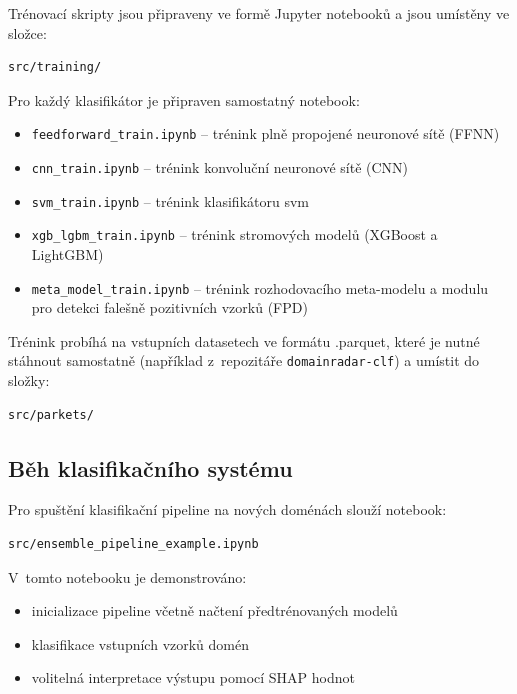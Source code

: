 Trénovací skripty jsou připraveny ve formě Jupyter notebooků a jsou umístěny ve složce:

\begin{verbatim}
src/training/
\end{verbatim}

Pro každý klasifikátor je připraven samostatný notebook:

\begin{itemize}
\item \texttt{feedforward\_train.ipynb} – trénink plně propojené neuronové sítě (FFNN)
\item \texttt{cnn\_train.ipynb} – trénink konvoluční neuronové sítě (CNN)
\item \texttt{svm\_train.ipynb} – trénink klasifikátoru svm
\item \texttt{xgb\_lgbm\_train.ipynb} – trénink stromových modelů (XGBoost a LightGBM)
\item \texttt{meta\_model\_train.ipynb} – trénink rozhodovacího meta-modelu a modulu pro detekci falešně pozitivních vzorků (FPD)
\end{itemize}

\noindent Trénink probíhá na vstupních datasetech ve formátu .parquet, které je nutné stáhnout samostatně (například z~repozitáře \texttt{domainradar-clf}) a umístit do složky:

\begin{verbatim}
src/parkets/
\end{verbatim}

\subsection*{Běh klasifikačního systému}

Pro spuštění klasifikační pipeline na nových doménách slouží notebook:

\begin{verbatim}
src/ensemble_pipeline_example.ipynb
\end{verbatim}

V~tomto notebooku je demonstrováno:

\begin{itemize}
\item inicializace pipeline včetně načtení předtrénovaných modelů
\item klasifikace vstupních vzorků domén
\item volitelná interpretace výstupu pomocí SHAP hodnot
\end{itemize}

